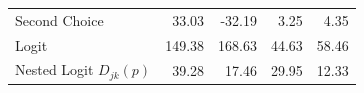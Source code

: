 \begin{tabular}{lrrrr}
 Second Choice                                                  &                                                                                            33.03 &         -32.19 &           3.25 &          4.35 \\
 Logit                                                          &                                                                                           149.38 &         168.63 &          44.63 &         58.46 \\
 Nested Logit $ D_{jk}(p) $                                     &                                                                                            39.28 &          17.46 &          29.95 &         12.33 \\
\midrule
\end{tabular}